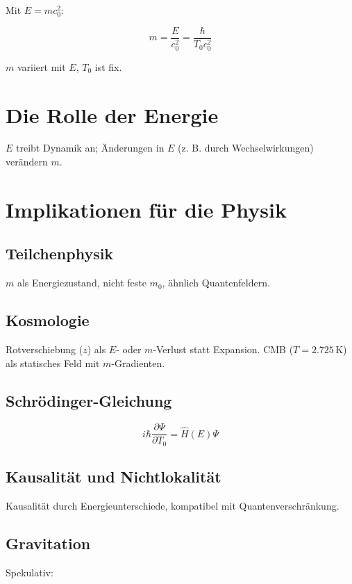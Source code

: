 \documentclass{article}
\begin{document}
	Mit \( E = m c_0^2 \):
	
	\[
	m = \frac{E}{c_0^2} = \frac{\hbar}{T_0 c_0^2}
	\]
	
	\( m \) variiert mit \( E \), \( T_0 \) ist fix.
	
	\section{Die Rolle der Energie}
	
	\( E \) treibt Dynamik an; Änderungen in \( E \) (z. B. durch Wechselwirkungen) verändern \( m \).
	
	\section{Implikationen für die Physik}
	
	\subsection{Teilchenphysik}
	
	\( m \) als Energiezustand, nicht feste \( m_0 \), ähnlich Quantenfeldern.
	
	\subsection{Kosmologie}
	
	Rotverschiebung (\( z \)) als \( E \)- oder \( m \)-Verlust statt Expansion. CMB (\( T = 2.725 \, \text{K} \)) als statisches Feld mit \( m \)-Gradienten.
	
	\subsection{Schrödinger-Gleichung}
	
	\[
	i\hbar \frac{\partial \Psi}{\partial T_0} = \hat{H}(E) \Psi
	\]
	
	\subsection{Kausalität und Nichtlokalität}
	
	Kausalität durch Energieunterschiede, kompatibel mit Quantenverschränkung.
	
	\subsection{Gravitation}
	
	Spekulativ:
	
\end{document}
